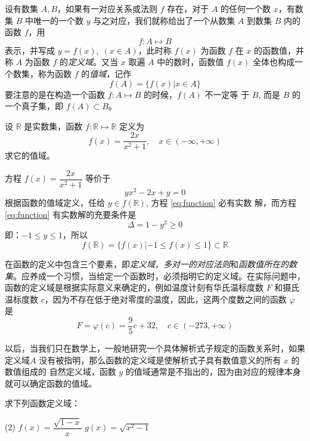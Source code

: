 \begin{Definition}
设有数集 $A,B$，如果有一对应关系或法则 $f$ 存在，对于 $A$ 的任何一个数 $x$，有数集 $B$ 中唯一的一个数 $y$ 与之对应，我们就称给出了一个从数集 $A$ 到数集 $B$ 内的函数 $f$，用
\[f:A\mapsto B\]
表示，并写成 $y=f(x),\; (x\in A)$，此时称 $f(x)$ 为函数 $f$ 在 $x$ 的函数值，并称 $A$ 为函数 $f$ 的\emph{定义域}。又当 $x$ 取遍 $A$ 中的数时，函数值 $f(x)$ 全体也构成一个数集，称为函数 $f$ 的\emph{值域}，记作
\[f(A)=\{f(x)|x\in A\}\]
要注意的是在构造一个函数 $f:A\mapsto B$ 的时候，$f(A)$ 不一定等
于 $B$, 而是 $B$ 的一个真子集，即 $f(A)\subset B$。
\end{Definition}



\begin{example}
设 $\mathbb{R}$ 是实数集，函数 $f:\mathbb{R}\mapsto\mathbb{R}$ 定义为
\[f(x)=\frac{2x}{x^2+1},\quad x\in(-\infty,+\infty)\]
求它的值域。
\end{example}

\begin{solution}
    方程 $f(x)=\dfrac{2x}{x^2+1}$ 等价于
    \begin{equation}
      \label{eq:function}
        yx^2-2x+y=0
    \end{equation}
根据函数的值域定义，任给 $y\in f(\mathbb{R})$, 方程 \eqref{eq:function} 必有实数
解，而方程 \eqref{eq:function} 有实数解的充要条件是
\[\Delta=1-y^2\geqslant 0\]
即：$-1\leqslant y\leqslant 1$，所以
\[f(\mathbb{R})=\{f(x)|-1\leqslant f(x)\leqslant 1\}\subset \mathbb{R}\]
\end{solution}

在函数的定义中包含三个要素，即\emph{定义域}，\emph{多对一的对应法则}和\emph{函数值所在的数集}。应养成一个习惯，当给定一个函数时，必须指明它的定义域。在实际问题中，函数的定义域是根据实际意义来确定的，例如温度计刻有华氏温标度数 $F$ 和摄氏温标度数 $c$，因为不存在低于绝对零度的温度，因此，这两个度数之间的函数 $\varphi$ 是
\[F=\varphi(c)=\frac{9}{5}c+32,\quad c\in (-273,+\infty)\]

以后，当我们只在数学上，一般地研究一个具体解析式子规定的函数关系时，如果定义域$A$ 没有被指明，那么函数的定义域是使解析式子具有数值意义的所有 $x$ 的数值组成的
自然定义域，函数 $y$ 的值域通常是不指出的，因为由对应的规律本身就可以确定函数的值域。

\begin{example}
  求下列函数定义域：
\begin{tasks}(2)
  \task $f(x)=\dfrac{\sqrt{1-x}}{x}$
  \task $g(x)=\sqrt{x^2-1}$
\end{tasks}
\end{example}

